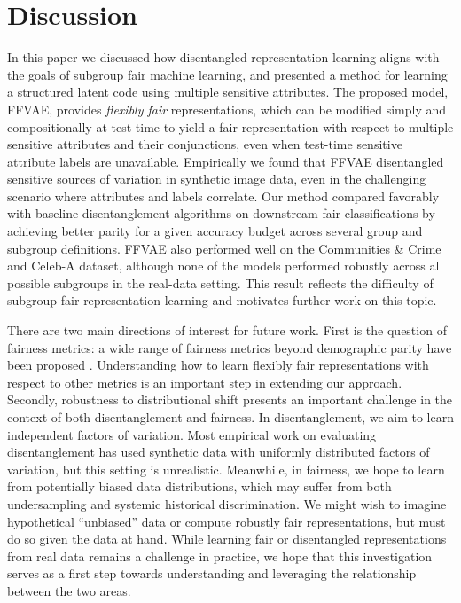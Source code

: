 \section{Discussion}
In this paper we discussed how disentangled representation learning aligns with the goals of subgroup fair machine learning, and presented a method for learning a structured latent code using multiple sensitive attributes.
The proposed model, FFVAE, provides \textit{flexibly fair} representations, which can be modified simply and compositionally at test time to yield a fair representation with respect to multiple sensitive attributes and their conjunctions, even when test-time sensitive attribute labels are unavailable.
Empirically we found that FFVAE disentangled sensitive sources of variation in synthetic image data, even in the challenging scenario where attributes and labels correlate.
Our method compared favorably with baseline disentanglement algorithms on downstream fair classifications by achieving better parity for a given accuracy budget across several group and subgroup definitions.
FFVAE also performed well on the Communities \& Crime and Celeb-A dataset, although none of the models performed robustly across all possible subgroups in the real-data setting.
This result reflects the difficulty of subgroup fair representation learning and motivates further work on this topic.

There are two main directions of interest for future work.
First is the question of fairness metrics: a wide range of fairness metrics beyond demographic parity have been proposed \citep{hardt2016equality,pleiss2017fairness}.
Understanding how to learn flexibly fair representations with respect to other metrics is an important step in extending our approach.
Secondly, robustness to distributional shift presents an important challenge in the context of both disentanglement and fairness.
In disentanglement, we aim to learn independent factors of variation.
Most empirical work on evaluating disentanglement has used synthetic data with uniformly distributed factors of variation, but this setting is unrealistic. 
Meanwhile, in fairness, we hope to learn from potentially biased data distributions, which may suffer from both undersampling and systemic historical discrimination.
We might wish to imagine hypothetical ``unbiased'' data or compute robustly fair representations, but must do so given the data at hand.
While learning fair or disentangled representations from real data remains a challenge in practice, we hope that this investigation serves as a first step towards understanding and leveraging the relationship between the two areas.
